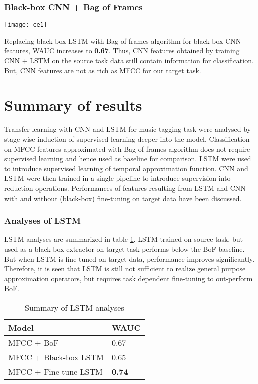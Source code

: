 \subsubsection{Black-box CNN + Bag of Frames}
\begin{minipage}{0.15\textwidth}
\texttt{[image: ce1]}
\end{minipage}
\begin{minipage}{0.80\textwidth}
Replacing black-box LSTM with Bag of frames algorithm for black-box CNN features, WAUC increases to \textbf{0.67}. Thus, CNN features obtained by training CNN + LSTM on the source task data still contain information for classification. But, CNN features are not as rich as MFCC for our target task.
\end{minipage}

\section{Summary of results}
\label{results}
Transfer learning with CNN and LSTM for music tagging task were analysed by stage-wise induction of supervised learning deeper into the model. Classification on MFCC features approximated with Bag of frames algorithm does not require supervised learning and hence used as baseline for comparison. LSTM were used to introduce supervised learning of temporal approximation function. CNN and LSTM were then trained in a single pipeline to introduce supervision into reduction operations. Performances of features resulting from LSTM and CNN with and without (black-box) fine-tuning on target data have been discussed. 

\subsubsection{Analyses of LSTM}
LSTM analyses are summarized in table \ref{tab:a9}. LSTM trained on source task, but used as a black box extractor on target task performs below the BoF baseline. But when LSTM is fine-tuned on target data, performance improves significantly. Therefore, it is seen that LSTM is still not sufficient to realize general purpose approximation operators, but requires task dependent fine-tuning to out-perform BoF.   

\begin{table}[H]
\label{tab:a9}
\centering
   \begin{tabular}{ | p{} | p{} |}
    \hline
    \textbf{Model} & \textbf{WAUC} \\ \hline
    MFCC + BoF &  0.67\\ \hline
    MFCC + Black-box LSTM &  0.65 \\ \hline
    MFCC + Fine-tune LSTM  &  \textbf{0.74}\\ \hline
    \hline
    \end{tabular}
    \caption{Summary of LSTM analyses}
\end{table}

